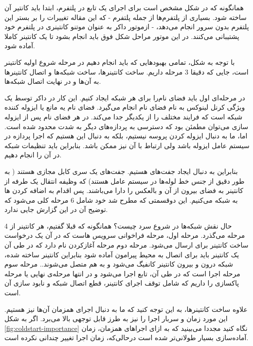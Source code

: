همانگونه که در شکل مشخص است برای اجرای یک تابع در پلتفرم، ابتدا باید کانتیر آن ساخته شود. بسیاری از پلتفرم‌ها از جمله پلتفرم  - که این مقاله تغییرات را بر بستر این پلتفرم بدون سرور انجام می‌دهد، - ازموتور داکر به عنوان موتنو کانتینری در پلتفرم خود پشتیبانی می‌کنند. در این موتور مراحل شکل فوق باید انجام بشود تا یک کانتینر کاملا آماده شود.

با توجه به شکل، تمامی بهبودهایی که باید انجام دهیم در مرحله شروع اولیه کانتینر است، جایی که دقیقا 3 مرحله داریم. ساخت کانتینرها، ساخت شبکه‌ها و اتصال کانتینرها به آن‌ها و در نهایت اتصال شبکه‌ها. 

در مرحله‌ای اول باید فضای نام‌را برای هر شبکه ایجاد کنیم. این کار در داکر توسط یک ویژگی کرنل لینوکس به نام فضای نام  انجام می‌گیرد. فضای نام یه مانع یا ایزوله کننده شبکه است که فرایند مختلف را از یکدیگر جدا می‌کند. در هر فضای نام پس از ایزوله سازی می‌توان مطمئن بود که دسترسی به پردازه‌های دیگر به شدت محدود شده است. اما، ما به دنبال ایزوله کردن پروسه نیستیم، بلکه به دنبال این هستیم که اجرا پردازه در سیستم عامل ایزوله باشد ولی ارتباط با آن نیز ممکن باشد. بنابراین باید تنظیمات شبکه در آن را انجام دهیم. 

بنابراین به دنبال ایجاد جفت‌های   هستیم. جفت‌های  یک سری کابل مجازی هستند ( به طور دقیق از جنس خط لوله‌ها در سیستم عامل هستند) که وظیفه انتقال یک طرفه از کانتینر به فضای بیرون از آن و بالعکس را دارا می‌باشند. پس اقدام به اضافه کردن ها به شبکه می‌کنیم. این دوقسمتی که مطرح شد خود شامل 6 مرحله کلی می‌شود که توضیح آن در این گزارش جایی ندارد.

حال نقش شبکه‌ها در شروع سرد چیست؟‌ همانگونه که قبلا گفتیم، هر کانتینر از 4 مرحله می‌گذرد. مرحله اول، مرحله فراخوانی سرویس هاست که در آن یک درخواست ساخت کانتینر برای  ارسال می‌شود. مرحله دوم مرحله آغاز‌کردن نام دارد که در طی آن یک کانتینر باید برای اتصال به محیط پیرامون آماده شود بنابراین کانتینر ساخته شده، شبکه درون و بیرون کانتینر کانفیگ می‌شود و به هم متصل می‌شوند.. مرحله سوم مرحله اجرا است که در طی آن، تابع اجرا می‌شود و در انتها مرحله‌ی نهایی یا مرحله پاکسازی را داریم که شامل توقف اجرای کانتینر، قطع اتصال شبکه و نابود سازی آن است. \cite{DockerInAction}

علاوه ساخت کانتینرها،‌ به این توجه کنید که ما به دنبال اجرای همزمان آن‌ها نیز هستیم. این مورد زمان و سربار اجرا را نیز به طرز قابل توجهی بالا می‌برد.	اگر به شکل \ref{fig:coldstart-importance} نگاه کنید مجددا می‌بینید که به ازای اجرا‌های همزمان، زمان آماده‌سازی بسیار طولانی‌تر شده است درحالی‌که، زمان اجرا تغییر چندانی نکرده است. 

